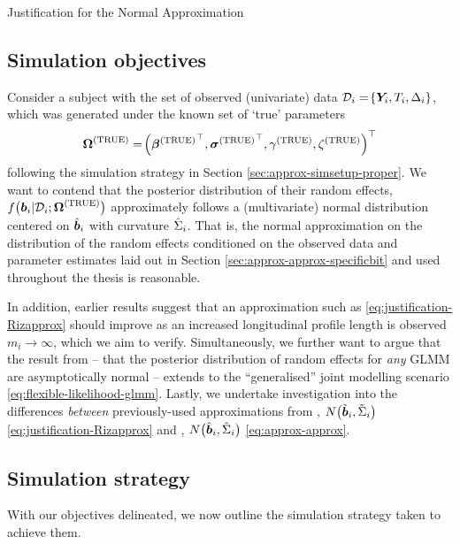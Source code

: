 \begin{chapter}{\label{cha:justification}Justification for the Normal Approximation}
  \subsection{Simulation objectives}\label{sec:justification-objective}
  Consider a subject with the set of observed (univariate) data $\mathcal{D}_i=\!\left\{\bm{Y}_i, T_i, \Delta_i\right\}$, which was generated under the known set of `true' parameters 
  \begin{align*}
      \bm{\mathrm{\Omega}}^{(\mathrm{TRUE})}=\!\left({\bm{\beta}^{(\mathrm{TRUE})}}^\top,{\bm{\sigma}^{(\mathrm{TRUE})}}^\top,\gamma^{(\mathrm{TRUE})},\zeta^{(\mathrm{TRUE})}\right)^\top
  \end{align*}
  following the simulation strategy in \eg Section \ref{sec:approx-simsetup-proper}. We want to contend that the posterior distribution of their random effects, $f\big(\bm{b}_i|\mathcal{D}_i;\bm{\mathrm{\Omega}}^{(\mathrm{TRUE})}\big)$ approximately follows a (multivariate) normal distribution centered on $\hat{\bm{b}}_i$ with curvature $\hat{\Sigma}_i$. That is, the normal approximation on the distribution of the random effects conditioned on the observed data and parameter estimates laid out in Section \ref{sec:approx-approx-specificbit} and used throughout the thesis is reasonable.

  In addition, earlier results \citep{baghishani2012, Rizopoulos2012} suggest that an approximation such as \eqref{eq:justification-Rizapprox} should improve as an increased longitudinal profile length is observed \ie $m_i\rightarrow\infty$, which we aim to verify. Simultaneously, we further want to argue that the result from \citet{baghishani2012} -- that the posterior distribution of random effects for \textit{any} GLMM are asymptotically normal -- extends to the ``generalised'' joint modelling scenario \eqref{eq:flexible-likelihood-glmm}. Lastly, we undertake investigation into the differences \textit{between} previously-used approximations from \citet{Rizopoulos2012}, \ie $N\big(\tilde{\bm{b}}_i,\tilde{\Sigma}_i\big)$ \eqref{eq:justification-Rizapprox} and \citet{Bernhardt15}, \ie $N\big(\hat{\bm{b}}_i,\hat{\Sigma}_i\big)$ \eqref{eq:approx-approx}.
  
  \subsection{Simulation strategy}\label{sec:justification-strategy}
  With our objectives delineated, we now outline the simulation strategy taken to achieve them.


\end{chapter}
